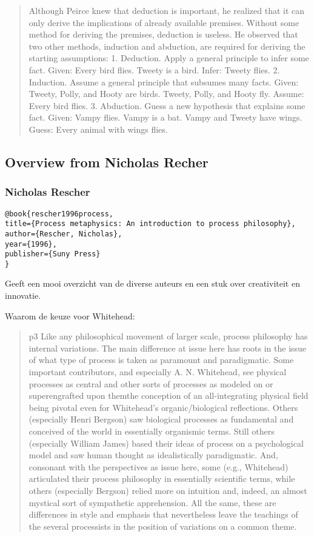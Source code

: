 \documentclass[a4paper]{Thesis}
\begin{document}
\begin{quotation}
	Although Peirce knew that deduction is important, he realized that it can only
	derive the implications of already available premises. Without some method for
	deriving the premises, deduction is useless. He observed that two other methods,
	induction and abduction, are required for deriving the starting assumptions:
	1. Deduction. Apply a general principle to infer some fact.
	Given: Every bird flies. Tweety is a bird.
	Infer: Tweety flies.
	2. Induction. Assume a general principle that subsumes many facts.
	Given: Tweety, Polly, and Hooty are birds.
	Tweety, Polly, and Hooty fly.
	Assume: Every bird flies.
	3. Abduction. Guess a new hypothesis that explains some fact.
	Given: Vampy flies. Vampy is a bat. Vampy and Tweety have wings.
	Guess: Every animal with wings flies.
	
\end{quotation}

\subsection{Overview from Nicholas Recher}

\subsubsection{Nicholas Rescher}
\begin{verbatim}
@book{rescher1996process,
title={Process metaphysics: An introduction to process philosophy},
author={Rescher, Nicholas},
year={1996},
publisher={Suny Press}
}
\end{verbatim}

Geeft een mooi overzicht van de diverse auteurs en een stuk over creativiteit en innovatie.

Waarom de keuze voor Whitehead:
\begin{quotation}
	p3
	Like any philosophical movement of larger scale, process philosophy has internal
	variations. The main difference at issue here has roots in the issue of what type of
	process is taken as paramount and paradigmatic. Some important contributors, and
	especially A. N. Whitehead, see physical processes as central and other sorts of processes
	as modeled on or superengrafted upon themthe conception of an all-integrating physical
	field being pivotal even for Whitehead's organic/biological reflections. Others (especially
	Henri Bergson) saw biological processes as fundamental and conceived of the world in
	essentially organismic terms. Still others (especially William James) based their ideas of
	process on a psychological model and saw human thought as idealistically paradigmatic.
	And, consonant with the perspectives as issue here, some (e.g., Whitehead) articulated
	their process philosophy in essentially scientific terms, while others (especially Bergson)
	relied more on intuition and, indeed, an almost mystical sort of sympathetic
	apprehension. All the same, these are differences in style and emphasis that nevertheless
	leave the teachings of the several processists in the position of variations on a common
	theme.
\end{quotation}
\end{document}
